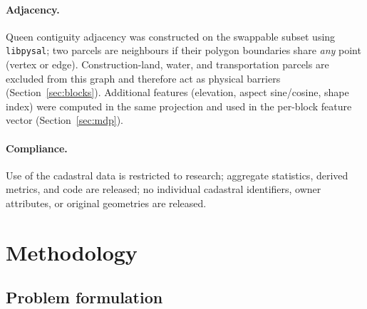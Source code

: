 \documentclass[preprint,12pt]{elsarticle}
\begin{document}
\paragraph{Adjacency.} Queen contiguity adjacency was constructed on the swappable subset using \texttt{libpysal}; two parcels are neighbours if their polygon boundaries share \emph{any} point (vertex or edge). Construction-land, water, and transportation parcels are excluded from this graph and therefore act as physical barriers (Section~\ref{sec:blocks}). Additional features (elevation, aspect sine/cosine, shape index) were computed in the same projection and used in the per-block feature vector (Section~\ref{sec:mdp}).

\paragraph{Compliance.} Use of the cadastral data is restricted to research; aggregate statistics, derived metrics, and code are released; no individual cadastral identifiers, owner attributes, or original geometries are released.


\section{Methodology}
\label{sec:methods}

\subsection{Problem formulation}
\label{sec:problem}
\end{document}
